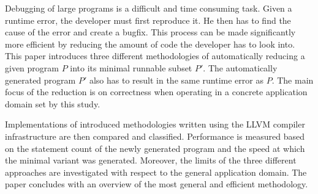 \documentclass[12pt]{report}
\begin{document}

Debugging of large programs is a difficult and time consuming task. Given a runtime error, the
developer must first reproduce it. He then has to find the cause of the error and create a bugfix.
 This process can be made significantly more efficient by reducing the amount of code the developer
 has to look into. This paper introduces three different methodologies of automatically reducing
 a given program $P$ into its minimal runnable subset $P'$. The automatically generated program $P'$
 also has to result in the same runtime error as $P$. The main focus of the reduction is on correctness
 when operating in a concrete application domain set by this study. \par
Implementations of introduced methodologies written using the LLVM compiler infrastructure are then
 compared and classified. Performance is measured based on the statement count of the newly generated
 program and the speed at which the minimal variant was generated. Moreover, the limits of the three
 different approaches are investigated with respect to the general application domain. The paper
 concludes with an overview of the most general and efficient methodology.
\end{document}
